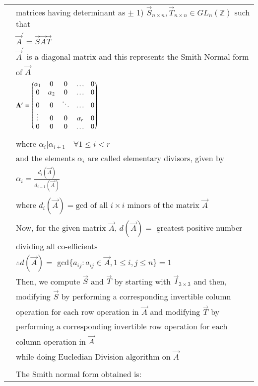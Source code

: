 \documentclass[journal,12pt]{IEEEtran}
\begin{document}
\begin{longtable}{|l|l|}
        & matrices having determinant as $\pm$ 1) $\vec{S}_{n \times n}, \vec{T}_{n \times n} \in GL_{n}(\mathbb Z)$ such that\\
        & $\vec{A}^{\prime} = \vec{S}\vec{A}\vec{T}$\\
        & $\vec{A}^{\prime}$ is a diagonal matrix and this represents the Smith Normal form\\
        & of $\vec{A}$\\
        & $\mathbf{A}^{\prime} = \begin{pmatrix}\alpha_1 & 0 & 0 & \dots & 0\\0 & \alpha_2 & 0 & \dots & 0\\ 0 & 0 & \ddots & \dots & 0 \\ \vdots & 0 & 0 & \alpha_r & 0\\ 0 & 0 & 0 & \dots & 0\end{pmatrix}$\\
        & \\
        & where $\alpha_i | \alpha_{i+1} \quad \forall 1 \leq i < r$\\
        & and the elements $\alpha_i$ are called elementary divisors, given by\\
        & $\alpha_i = \frac{d_i(\vec{A})}{d_{i-1}(\vec{A})}$\\
        & \\
        & where $d_i(\vec{A}) = \text{gcd of all }i\times i\text{ minors of the matrix } \vec{A}$\\
        & \\
        & Now, for the given matrix $\vec{A}$, $d(\vec{A}) = $ greatest positive number\\
        & dividing all co-efficients\\
        & $\therefore d(\vec{A}) =$ gcd$\{a_{ij} : a_{ij} \in \vec{A}, 1 \leq i,j \leq n \} = 1$\\
        & Then, we compute $\vec{S}$ and $\vec{T}$ by starting with $\vec{I}_{3 \times 3}$ and then,\\
        & modifying $\vec{S}$ by performing a corresponding invertible column\\
        & operation for each row operation in $\vec{A}$ and modifying $\vec{T}$ by\\
        & performing a corresponding invertible row operation for each\\        & column operation in $\vec{A}$\\
        & while doing Eucledian Division algorithm on $\vec{A}$\\
        & \\
        & The Smith normal form obtained is:\\

\end{longtable}
\end{document}
